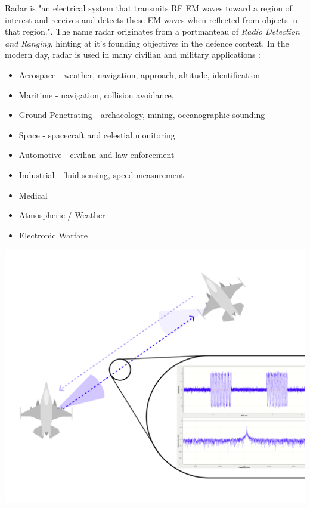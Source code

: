 Radar is "an electrical system that transmits \ac{RF} \ac{EM} waves toward a region of interest and receives and detects these EM waves when reflected
from objects in that region."\cite{richards_principles_2010}. The name radar originates from a portmanteau of \textit{Radio Detection and Ranging}\cite{the_joint_board_on_scientific_information_policy_radar_1945}, hinting at it's founding objectives in the defence context. In the modern day, radar is used in many civilian and military applications \cite{merrill_i_skolnik_radar_nodate, desai_how_2022}:
\begin{itemize}
    \item Aerospace - weather, navigation, approach, altitude, identification
    \item Maritime - navigation, collision avoidance,  
    \item Ground Penetrating - archaeology, mining, oceanographic sounding
    \item Space - spacecraft and celestial monitoring
    \item Automotive - civilian and law enforcement
    \item Industrial - fluid sensing, speed measurement
    \item Medical
    \item Atmospheric / Weather
    \item Electronic Warfare
\end{itemize}

\includegraphics[width=\textwidth]{Figures/Senario_ Single Radar; single signal.png}

